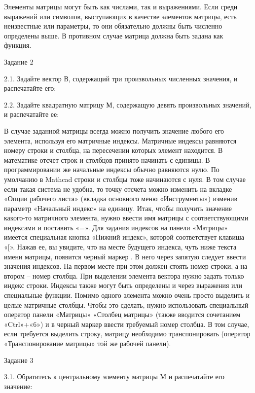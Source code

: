 Элементы матрицы могут быть как числами, так и выражениями. Если среди выражений или символов, выступающих в качестве элементов матрицы, есть неизвестные или параметры, то они обязательно должны быть численно определены выше. В противном случае матрица должна быть задана как функция.




Задание 2

2.1. Задайте вектор В, содержащий три произвольных численных значения, и распечатайте его:

		

2.2. Задайте квадратную матрицу М, содержащую девять произвольных значений, и распечатайте ее:

		

В случае заданной матрицы всегда можно получить значение любого его элемента, используя его матричные индексы. Матричные индексы равняются номеру строки и столбца, на пересечении которых элемент находится. В математике отсчет строк и столбцов принято начинать с единицы. В программировании же начальные индексы обычно равняются нулю. По умолчанию в Mathcad строки и столбцы тоже начинаются с нуля. В том случае если такая система не удобна, то точку отсчета можно изменить на вкладке «Опции рабочего листа» (вкладка основного меню «Инструменты») изменив параметр «Начальный индекс» на единицу.
Итак, чтобы получить значение какого-то матричного элемента, нужно ввести имя матрицы с соответствующими индексами и поставить «=». Для задания индексов на панели «Матрицы» имеется специальная кнопка «Нижний индекс», которой соответствует клавиша «[». Нажав ее, вы увидите, что на месте будущего индекса, чуть ниже текста имени матрицы, появится черный маркер . В него через запятую следует ввести значения индексов. На первом месте при этом должен стоять номер строки, а на втором – номер столбца. При выделении элемента вектора нужно задать только индекс строки. Индексы также могут быть определены и через выражения или специальные функции.
Помимо одного элемента можно очень просто выделить и целые матричные столбцы. Чтобы это сделать, нужно использовать специальный оператор панели «Матрицы» «Столбец матрицы» (также вводится сочетанием «Ctrl»+«6»)  и в черный маркер ввести требуемый номер столбца. В том случае, если требуется выделить строку, матрицу необходимо транспонировать (оператор «Транспонирование матрицы» той же рабочей панели).

Задание 3

3.1. Обратитесь к центральному элементу матрицы М и распечатайте его значение:



